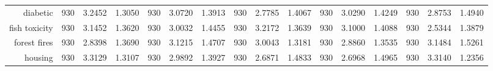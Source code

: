 \begin{table}[htbp]
{\begin{tabular}{rccccccccccccccc}
			diabetic                            & 930                                     & 3.2452                                                                    & 1.3050          & 930                            & 3.0720                                                                    & 1.3913          & 930                             & \cellcolor[rgb]{ .776,  .937,  .808}\textcolor[rgb]{ 0,  .38,  0}{2.7785}          & 1.4067          & 930                             & 3.0290                                                                    & 1.4249          & 930                             & 2.8753                                                                    & 1.4940          \\
			fish toxicity                       & 930                                     & 3.1452                                                                    & 1.3620          & 930                            & 3.0032                                                                    & 1.4455          & 930                             & 3.2172                                                                             & 1.3639          & 930                             & 3.1000                                                                    & 1.4088          & 930                             & \cellcolor[rgb]{ .776,  .937,  .808}\textcolor[rgb]{ 0,  .38,  0}{2.5344} & 1.3879          \\
			forest fires                        & 930                                     & \cellcolor[rgb]{ .776,  .937,  .808}\textcolor[rgb]{ 0,  .38,  0}{2.8398} & 1.3690          & 930                            & 3.1215                                                                    & 1.4707          & 930                             & 3.0043                                                                             & 1.3181          & 930                             & 2.8860                                                                    & 1.3535          & 930                             & 3.1484                                                                    & 1.5261          \\
			housing                             & 930                                     & 3.3129                                                                    & 1.3107          & 930                            & 2.9892                                                                    & 1.3927          & 930                             & \cellcolor[rgb]{ .776,  .937,  .808}\textcolor[rgb]{ 0,  .38,  0}{2.6871}          & 1.4833          & 930                             & 2.6968                                                                    & 1.4965          & 930                             & 3.3140                                                                    & 1.2356          \\

\end{tabular}}
\end{table}
